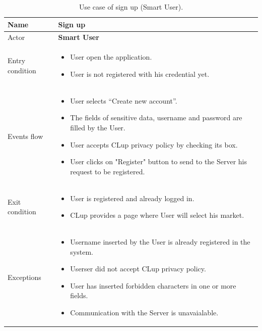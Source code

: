 \bigbreak
\begin{table}[H]\begin{tabular}{|p{5cm} | p{7cm} | }
	\hline
	Name & \textbf{Sign up} \\
	\hline
	Actor & \textbf{Smart User} \\
	\hline
	Entry condition &
	\begin{itemize}
		\item User open the application.
        \item User is not registered with his credential yet. 
	\end{itemize} \\
	\hline
	Events flow & 
	\begin{itemize}
		\item User selects “Create new account”.
		\item The fields of sensitive data, username and password are filled by the User.
		\item User accepts CLup privacy policy by checking its box.
		\item User clicks on "Register" button to send to the Server his request to be registered.
	\end{itemize} \\
	\hline
	Exit condition & \begin{itemize} 
    \item User is registered and already logged in. 
    \item CLup provides a page where User will select his market.
    \end{itemize}\\
	\hline 
	Exceptions &
	\begin{itemize}
		\item Username inserted by the User is already registered in the system.
		\item Userser did not accept CLup privacy policy.
		\item User has inserted forbidden characters in one or more fields.
        \item Communication with the Server is unavaialable.
	\end{itemize} \\
	\hline
\end{tabular}
\caption{Use case of sign up (Smart User).}
\end{table}

\bigbreak

